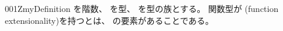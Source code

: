 \documentclass[index]{subfiles}
\begin{document}
\begin{myBlock}{001Z}{myDefinition}
  を階数、
  を型、
  を型の族とする。
  関数型が
  (function extensionality)を持つとは、
  の要素があることである。
\end{myBlock}
\end{document}
